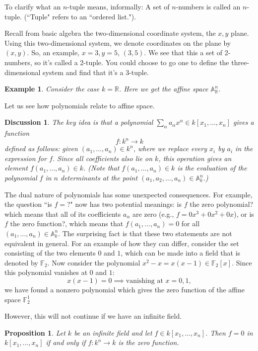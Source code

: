 \documentclass[12pt,reqno]{amsart}
\theoremstyle{plain}
\newtheorem{disc}{Discussion}
\newtheorem{prop}{Proposition}
\newtheorem{ex}{Example}
\newcommand{\aff}{\mathbb A}
\newcommand{\ff}{\mathbb F}
\newcommand{\pring}{k[x_1, \ldots , x_n]}
\newcommand{\poly}{\sum_{\alpha} a_{\alpha} x^{\alpha}}
\newcommand{\rr}{\mathbb R}
\begin{document}
To clarify what an $n$-tuple means, informally: A set of $n$-numbers is called an $n$-tuple. (``Tuple" refers to an ``ordered list."). 

Recall from basic algebra the two-dimensional coordinate system, the $x,y$ plane. Using this two-dimensional system, we denote coordinates on the plane by $(x,y)$. So, an example, $x=3, y =5$, $(3,5)$. We see that this a set of 2-numbers, so it's called a 2-tuple. You could choose to go one to define the three-dimensional system and find that it's a 3-tuple. 
\begin{ex} Consider the case $k = \rr$. Here we get the affine space $\aff_{\rr}^n$.
\end{ex} 

Let us see how polynomials relate to affine space. 
\begin{disc} The key idea is that a polynomial $\poly \in \pring$ gives a function $$f \colon k^n \to k$$ defined as follows: given $(a_1, \ldots , a_n) \in k^n$, where we replace every $x_i$ by $a_i$ in the expression for $f$. Since all coefficients also lie on $k$, this operation gives an element $f (a_1, \ldots, a_n) \in k$. (Note that $f(a_1, \ldots, a_n) \in k$ is the evaluation of the polynomial $f$ in $n$ determinants at the point $(a_1, a_2, \ldots , a_n) \in \aff_{k}^n$.)
\end{disc}

The dual nature of polynomials has some unexpected consequences. For example, the question ``is $f =$?" now has two potential meanings: is $f$ the zero polynomial? which means that all of its coefficients $a_{\alpha}$ are zero (e.g., $f = 0x^3 + 0x^2 +0x$), or is $f$ the zero function?, which means that $f(a_1, \ldots , a_n) = 0$ for all $(a_1, \ldots, a_n) \in \aff_k^n$. The surprising fact is that these two statements are not equivalent in general. For an example of how they can differ, consider the set consisting of the two elements $0$ and $1$, which can be made into a field that is denoted by $\ff_2$. Now consider the polynomial $x^2 - x = x(x-1) \in \ff_2[x]$. Since this polynomial vanishes at $0$ and $1$: $$x(x-1) = 0 \implies \text{vanishing at }x =0, 1 ,$$ we have found a nonzero polynomial which gives the zero function of the affine space $\ff_2^1$

However, this will not continue if we have an infinite field.
\begin{prop} Let $k$ be an infinite field and let $f \in k [x_1, \ldots, x_n]$. Then $f = 0$ in $k[x_1, \ldots, x_n]$ if and only if $f \colon k^n \to k$ is the zero function.
\end{prop}
\end{document}
